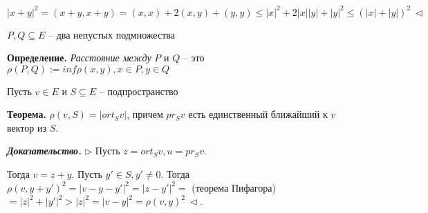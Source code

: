 $|x + y|^2 = (x+y, x+y) = (x,x) + 2(x,y) + (y,y) \leq |x|^2 + 2 |x| |y| + |y|^2 \leq (|x| + |y|)^2 \ \lhd$

\vspace{\baselineskip}
$P, Q \subseteq E$ -- два непустых подмножества

\textbf{Определение.} \textit{Расстояние между} $P$ и $Q$ -- это $\rho(P, Q) := inf \rho (x, y), x \in P, y \in Q$

\vspace{\baselineskip}
Пусть $v \in E$ и $S \subseteq E$ -- подпространство

\textbf{Теорема.} $\rho (v, S) = |ort_S v|$, причем $pr_S v$ есть единственный ближайший к $v$ вектор из $S$. 

\vspace{\baselineskip}
\textbf{\textit{Доказательство.}} $\rhd$ Пусть $z = ort_S v, u = pr_S v$.

Тогда $v = z + y$. Пусть $y' \in S, y' \neq 0$. Тогда $\rho (v, y + y')^2 = |v - y - y'|^2 = |z - y'|^2 =$ (теорема Пифагора) $= |z|^2 + |y'|^2 > |z|^2 = |v - y|^2 = \rho (v, y)^2 \ \lhd$.

